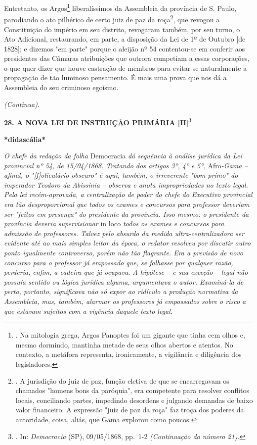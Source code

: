 Entretanto, os Argos\footnote{. Na mitologia grega, Argos Panoptes foi
  um gigante que tinha cem olhos e, mesmo dormindo, mantinha metade de
  seus olhos abertos e atentos. No contexto, a metáfora representa,
  ironicamente, a vigilância e diligência dos legisladores.}
liberalíssimos da Assembleia da província de S. Paulo, parodiando o ato
pilhérico de certo juiz de paz da roça\footnote{. A jurisdição do juiz
  de paz, função eletiva de que se encarregavam os chamados "homens bons
  da paróquia", era competente para resolver conflitos locais,
  conciliando partes, impedindo desordens e julgando demandas de baixo
  valor financeiro. A expressão "juiz de paz da roça" faz troça dos
  poderes da autoridade, coisa, aliás, que Gama explorou como poucos.},
que revogou a Constituição do império em seu distrito, revogaram também,
por seu turno, o Ato Adicional, restaurando, em parte, a disposição da
Lei de 1º de Outubro {[}de 1828{]}; e dizemos "em parte" porque o
aleijão nº 54 contentou-se em conferir aos presidentes das Câmaras
atribuições que outrora competiam a essas corporações, o que quer dizer
que houve castração de membros para evitar-se naturalmente a propagação
de tão luminoso pensamento. É mais uma prova que nos dá a Assembleia do
seu criminoso egoísmo.

\emph{(Continua)}.

\textbf{28. A NOVA LEI DE INSTRUÇÃO PRIMÁRIA {[}II{]}}\footnote{. In:
  \emph{Democracia} (SP), 09/05/1868, pp.~1-2 \emph{(Continuação do
  número 21).}}

\textbf{*didascália*}

\emph{O chefe da redação da folha} Democracia \emph{dá sequência à
análise jurídica da Lei provincial nº 54, de 15/04/1868. Tratando dos
artigos 3º, 4º e 5º,} Afro\emph{-Gama -- afinal, o "{[}f{]}oliculário
obscuro" é aqui, também, o irreverente "bom primo" do imperador Teodoro
da Abissínia -- observa e anota impropriedades no texto legal. Pela lei
recém-aprovada, a centralização de poder do chefe do Executivo
provincial era tão desproporcional que todos os exames e concursos para
professor deveriam ser "feitos em presença" do presidente da província.
Isso mesmo: o presidente da província deveria supervisionar} in loco
\emph{todos os exames e concursos para admissão de professores. Talvez
pelo absurdo da medida ultra-centralizadora ser evidente até ao mais
simples leitor da época, o redator resolveu por discutir outro ponto
igualmente controverso, porém não tão flagrante. Era a previsão de novo
concurso para o professor já empossado que, se falhasse por qualquer
razão, perderia, enfim, a cadeira que já ocupava. A hipótese -- e sua
exceção -- legal não possuía sentido ou lógica jurídica alguma,
argumentava o autor. Examiná-la de perto, portanto, significava não só
expor ao ridículo a produção normativa da Assembleia, mas, também,
alarmar os professores já empossados sobre o risco a que estavam
sujeitos com a vigência daquele texto legal.}

